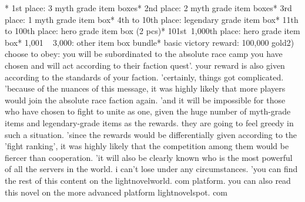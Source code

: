 * 1st place: 3 myth grade item boxes* 2nd place: 2 myth grade item boxes* 3rd place: 1 myth grade item box* 4th to 10th place: legendary grade item box* 11th to 100th place: hero grade item box (2 pcs)* 101st~1,000th place: hero grade item box* 1,001 ~ 3,000: other item box bundle* basic victory reward: 100,000 gold2) choose to obey: you will be subordinated to the absolute race camp you have chosen and will act according to their faction quest'.
 your reward is also given according to the standards of your faction.
'certainly, things got complicated.
'because of the nuances of this message, it was highly likely that more players would join the absolute race faction again.
'and it will be impossible for those who have chosen to fight to unite as one, given the huge number of myth-grade items and legendary-grade items as the rewards.
 they are going to feel greedy in such a situation.
'since the rewards would be differentially given according to the 'fight ranking', it was highly likely that the competition among them would be fiercer than cooperation.
'it will also be clearly known who is the most powerful of all the servers in the world.
 i can't lose under any circumstances.
'you can find the rest of this content on the lightnov­elworld.
com platform.
 you can also read this novel on the more advanced platform lightnovelspot.
com

 
